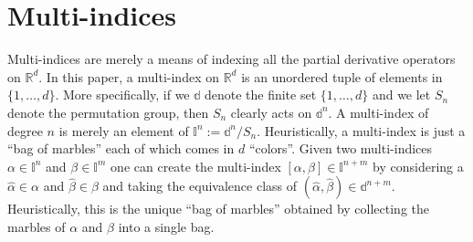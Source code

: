 \documentclass[12pt]{amsart}
\newcommand{\R}{\ensuremath{\mathbb{R}}}
\begin{document}
\section{Multi-indices}
\label{app:multi}
Multi-indices are merely a means of indexing all the partial derivative
operators on $\R^d$.
In this paper, a multi-index on $\R^d$ is an unordered tuple of elements in $\{1,\dots,d\}$.
More specifically, if we $\mathbb{d}$ denote the finite set $\{ 1,\dots,d\}$ and we let $S_n$ denote the permutation group, then $S_n$ clearly acts
on $\mathbb{d}^n$.
A multi-index of degree $n$ is merely an element of $\mathbb{I}^n := \mathbb{d}^n / S_n$.
Heuristically, a multi-index is just a ``bag of marbles'' each of which comes in $d$ ``colors''.
Given two multi-indices $\alpha \in \mathbb{I}^n$ and $\beta \in \mathbb{I}^m$ one can create the multi-index $[\alpha,\beta] \in \mathbb{I}^{n+m}$ 
by considering a $\hat{\alpha} \in \alpha$ and $\hat{\beta} \in \beta$ and taking the equivalence class of $(\hat{\alpha},\hat{\beta}) \in \mathbb{d}^{n+m}$.
  Heuristically, this is the unique ``bag of marbles'' obtained by collecting the marbles of $\alpha$ and $\beta$ into a single bag.
\end{document}

